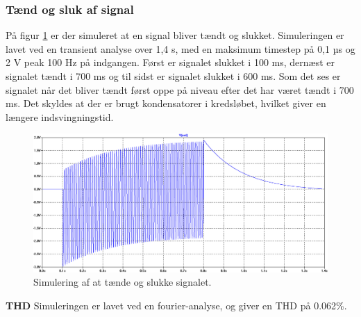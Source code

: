 \subsubsection*{Tænd og sluk af signal}
På figur \ref{indgangsvaelger_taendsluk} er der simuleret at en signal bliver tændt og slukket. Simuleringen er lavet ved en transient analyse over 1,4 s, med en maksimum timestep på 0,1 µs og 2 V peak 100 Hz på indgangen. Først er signalet slukket i 100 ms, dernæst er signalet tændt i 700 ms og til sidst er signalet slukket i 600 ms. Som det ses er signalet når det bliver tændt først oppe på niveau efter det har været tændt i 700 ms. Det skyldes at der er brugt kondensatorer i kredsløbet, hvilket giver en længere indsvingningstid.
\begin{figure}[h]
\centering
\includegraphics[width=\textwidth]{teknisk/indgangsvaelger/simulering/taend_sluk.png}
\caption{Simulering af at tænde og slukke signalet.}
\label{indgangsvaelger_taendsluk}
\end{figure}

\textbf{THD}
\newline
Simuleringen er lavet ved en fourier-analyse, og giver en THD på 0.062\%.
